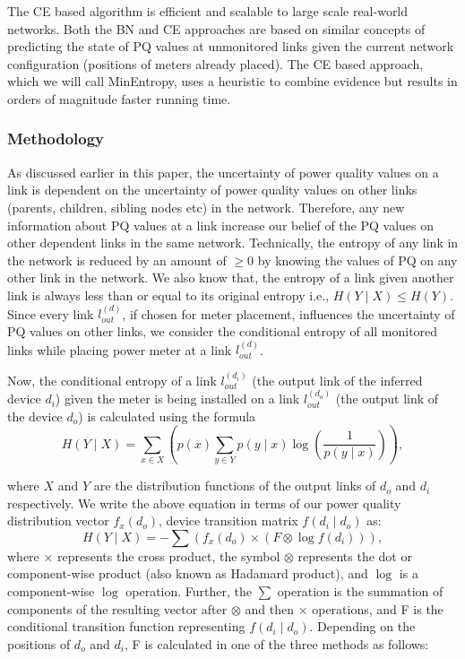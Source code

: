 The CE based algorithm is efficient and scalable to large scale real-world networks. Both the BN and CE approaches are based on similar concepts of predicting the state of PQ values at unmonitored links given the current network configuration (positions of meters already placed). The CE based approach, which we will call MinEntropy, uses a heuristic to combine evidence but results in orders of magnitude faster running time.

\subsubsection{Methodology}
As discussed earlier in this paper, the uncertainty of power quality values on a link is dependent on the uncertainty of power quality values on other links (parents, children, sibling nodes etc) in the network. Therefore, any new information about PQ values at a link increase our belief of the PQ values on other dependent links in the same network. Technically, the entropy of any link in the network is reduced by an amount of $\ge0$ by knowing the values of PQ on any other link in the network. We also know that, the entropy of a link given another link is always less than or equal to its original entropy i.e., $H(Y \mid X) \leq H(Y)$. Since every link $l_{out}^{(d)}$, if chosen for meter placement, influences the uncertainty of PQ values on other links, we consider the conditional entropy of all monitored links while placing power meter at a link $l_{out}^{(d)}$.

Now, the conditional entropy of a link $l_{out}^{(d_i)}$ (the output link of the inferred device $d_i$) given the meter is being installed on a link $l_{out}^{(d_o)}$ (the output link of the device $d_o$) is calculated using the formula \[H(Y \mid X) = \sum_{x \in X} \left( p(x) \sum_{y \in Y} p(y \mid x) \log (\frac{1}{p(y \mid x)})\right),\]

\noindent where $X$ and $Y$ are the distribution functions of the output links of $d_o$ and $d_i$ respectively. We write the above equation in terms of our power quality distribution vector $f_x(d_o)$, device transition matrix $f(d_i \mid d_o)$ as:
\[H(Y \mid X) = - \sum \left( f_x(d_o) \times \left(F \otimes \log f(d_i)\right)  \right), \]
\noindent where $\times$ represents the cross product, the symbol $\otimes$ represents the dot or component-wise product (also known as Hadamard product), and $\log$ is a component-wise $\log$ operation. Further, the $\sum$ operation is the summation of components of the resulting vector after $\otimes$ and then $\times$ operations, and F is the conditional transition function representing $f(d_i \mid d_o)$.  Depending on the positions of $d_o$ and $d_i$, F is calculated in one of the three methods as follows:

